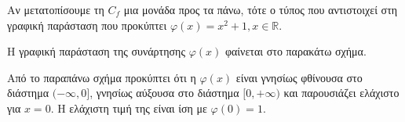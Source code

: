 \begin{alist}
\item Αν μετατοπίσουμε τη $C_f$ μια μονάδα προς τα πάνω, τότε ο τύπος που αντιστοιχεί στη γραφική παράσταση που προκύπτει $\varphi(x) = x^2 + 1, x \in \mathbb{R}$.
\item Η γραφική παράσταση της συνάρτησης $\varphi(x)$ φαίνεται στο παρακάτω σχήμα.
\begin{center}
\end{center}
\item Από το παραπάνω σχήμα προκύπτει ότι η $\varphi(x)$ είναι γνησίως φθίνουσα στο διάστημα $(-\infty, 0]$, γνησίως αύξουσα στο διάστημα $[0, +\infty)$ και παρουσιάζει ελάχιστο για $x = 0$. Η ελάχιστη τιμή της είναι ίση με $\varphi(0) = 1$.
\end{alist}


